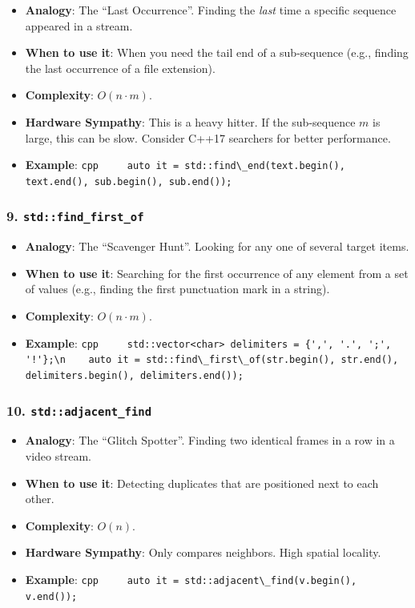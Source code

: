 \begin{itemize}
\tightlist
\item
  \textbf{Analogy}: The ``Last Occurrence''. Finding the \emph{last}
  time a specific sequence appeared in a stream.
\item
  \textbf{When to use it}: When you need the tail end of a sub-sequence
  (e.g., finding the last occurrence of a file extension).
\item
  \textbf{Complexity}: \(O(n \cdot m)\).
\item
  \textbf{Hardware Sympathy}: This is a heavy hitter. If the
  sub-sequence \(m\) is large, this can be slow. Consider C++17
  searchers for better performance.
\item
  \textbf{Example}:
  \passthrough{\lstinline!cpp     auto it = std::find\_end(text.begin(), text.end(), sub.begin(), sub.end());!}
\end{itemize}

\hypertarget{stdfind_first_of}{%
\subsubsection{\texorpdfstring{9.
\texttt{std::find\_first\_of}}{9. std::find\_first\_of}}\label{stdfind_first_of}}

\begin{itemize}
\tightlist
\item
  \textbf{Analogy}: The ``Scavenger Hunt''. Looking for any one of
  several target items.
\item
  \textbf{When to use it}: Searching for the first occurrence of any
  element from a set of values (e.g., finding the first punctuation mark
  in a string).
\item
  \textbf{Complexity}: \(O(n \cdot m)\).
\item
  \textbf{Example}:
  \passthrough{\lstinline"cpp     std::vector<char> delimiters = \{',', '.', ';', '!'\};\\n    auto it = std::find\_first\_of(str.begin(), str.end(), delimiters.begin(), delimiters.end());"}
\end{itemize}

\hypertarget{stdadjacent_find}{%
\subsubsection{\texorpdfstring{10.
\texttt{std::adjacent\_find}}{10. std::adjacent\_find}}\label{stdadjacent_find}}

\begin{itemize}
\tightlist
\item
  \textbf{Analogy}: The ``Glitch Spotter''. Finding two identical frames
  in a row in a video stream.
\item
  \textbf{When to use it}: Detecting duplicates that are positioned next
  to each other.
\item
  \textbf{Complexity}: \(O(n)\).
\item
  \textbf{Hardware Sympathy}: Only compares neighbors. High spatial
  locality.
\item
  \textbf{Example}:
  \passthrough{\lstinline!cpp     auto it = std::adjacent\_find(v.begin(), v.end());!}
\end{itemize}

